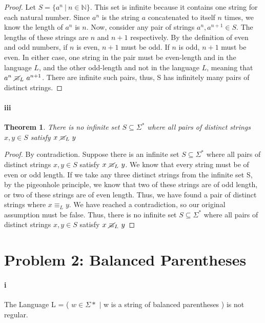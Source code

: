 \documentclass[10pt,letter]{article}
\newtheorem*{thm}{Theorem}
\begin{document}
\begin{proof}
Let $S= \{a^n\ |\ n \in \mathbb{N}\}$. This set is infinite because it contains one string for each natural number. Since $a^n$ is the string $a$ concatenated to itself $n$ times, we know the length of $a^n$ is $n$. Now, consider any pair of strings $a^n, a^{n+1} \in S$. The lengths of these strings are $n$ and $n+1$ respectively. By the definition of even and odd numbers, if $n$ is even, $n+1$ must be odd. If $n$ is odd, $n+1$ must be even. In either case, one string in the pair must be even-length and in the language $L$, and the other odd-length and not in the language $L$, meaning that $a^n\ \cancel{\equiv}_L\ a^{n+1}$. There are infinite such pairs, thus, S has infinitely many pairs of distinct strings.
\end{proof}

\paragraph{iii}
\begin{thm} There is no infinite set $S \subseteq \Sigma^*$ where all pairs of distinct strings $x,y\in S$ satisfy $x\ \cancel{\equiv}_L\ y$ \end{thm}

\begin{proof}
By contradiction. Suppose there is an infinite set $S \subseteq \Sigma^*$ where all pairs of distinct strings $x,y \in S$ satisfy $x\ \cancel{\equiv}_L\ y$. We know that every string must be of even or odd length. If we take any three distinct strings from the infinite set S, by the pigeonhole principle, we know that two of these strings are of odd length, or two of these strings are of even length. Thus, we have found a pair of distinct strings where $x \equiv_L y$. We have reached a contradiction, so our original assumption must be false. Thus, there is no infinite set $S \subseteq \Sigma^*$ where all pairs of distinct strings $x,y\in S$ satisfy $x\ \cancel{\equiv}_L\ y$
\end{proof}

\section*{Problem 2: Balanced Parentheses}
\paragraph{i}
\thm The Language L = ( $w \in \Sigma*$ $\mid$ w is a string of balanced parentheses ) is not regular. 
\end{document}
